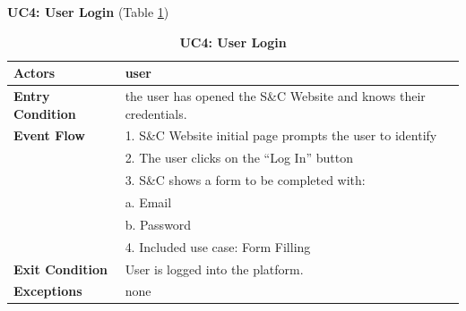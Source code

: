 \textbf{UC4: User Login }(Table \ref{tab:UC4})
\begin{table}[H]
\centering
\caption{\textbf{UC4: User Login}}
\label{tab:UC4}
\begin{tabularx}{\textwidth}{|X|X|}
\hline
\textbf{Actors}           & user                                                       \\ \hline
\textbf{Entry Condition}   & the user has opened the S\&C Website and knows their credentials. \\ \hline
\textbf{Event Flow}        & 1. S\&C Website initial page prompts the user to identify  \\
                           & 2. The user clicks on the “Log In” button                   \\
                           & 3. S\&C shows a form to be completed with:                  \\
                           & \hspace{1em} a. Email                                        \\
                           & \hspace{1em} b. Password                                     \\
                           & 4. Included use case: Form Filling                           \\ \hline
\textbf{Exit Condition}    & User is logged into the platform.                           \\ \hline
\textbf{Exceptions}        & none                                                        \\ \hline
\end{tabularx}
\end{table}

